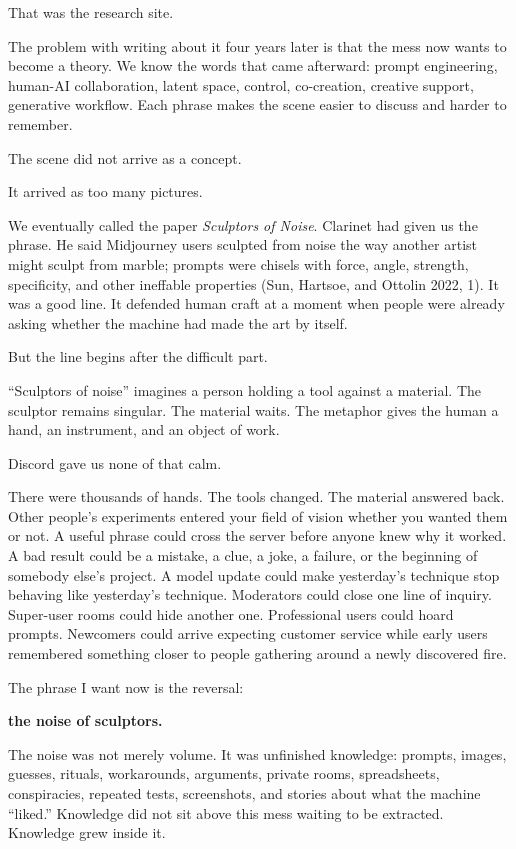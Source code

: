 \documentclass[
]{article}
\begin{document}
That was the research site.

The problem with writing about it four years later is that the mess now
wants to become a theory. We know the words that came afterward: prompt
engineering, human-AI collaboration, latent space, control, co-creation,
creative support, generative workflow. Each phrase makes the scene
easier to discuss and harder to remember.

The scene did not arrive as a concept.

It arrived as too many pictures.

We eventually called the paper \emph{Sculptors of Noise}. Clarinet had
given us the phrase. He said Midjourney users sculpted from noise the
way another artist might sculpt from marble; prompts were chisels with
force, angle, strength, specificity, and other ineffable properties
(Sun, Hartsoe, and Ottolin 2022, 1). It was a good line. It defended
human craft at a moment when people were already asking whether the
machine had made the art by itself.

But the line begins after the difficult part.

``Sculptors of noise'' imagines a person holding a tool against a
material. The sculptor remains singular. The material waits. The
metaphor gives the human a hand, an instrument, and an object of work.

Discord gave us none of that calm.

There were thousands of hands. The tools changed. The material answered
back. Other people's experiments entered your field of vision whether
you wanted them or not. A useful phrase could cross the server before
anyone knew why it worked. A bad result could be a mistake, a clue, a
joke, a failure, or the beginning of somebody else's project. A model
update could make yesterday's technique stop behaving like yesterday's
technique. Moderators could close one line of inquiry. Super-user rooms
could hide another one. Professional users could hoard prompts.
Newcomers could arrive expecting customer service while early users
remembered something closer to people gathering around a newly
discovered fire.

The phrase I want now is the reversal:

\textbf{the noise of sculptors.}

The noise was not merely volume. It was unfinished knowledge: prompts,
images, guesses, rituals, workarounds, arguments, private rooms,
spreadsheets, conspiracies, repeated tests, screenshots, and stories
about what the machine ``liked.'' Knowledge did not sit above this mess
waiting to be extracted. Knowledge grew inside it.
\end{document}
